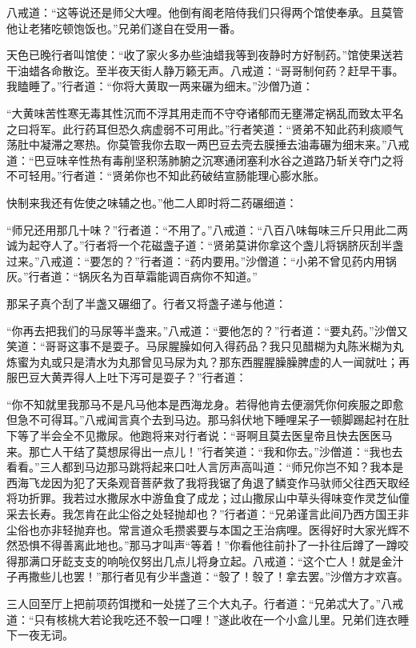 \documentclass[12pt,UTF8]{ctexbook}
\begin{document}
八戒道：“这等说还是师父大哩。他倒有阁老陪侍我们只得两个馆使奉承。且莫管他让老猪吃顿饱饭也。”兄弟们遂自在受用一番。

天色已晚行者叫馆使：“收了家火多办些油蜡我等到夜静时方好制药。”馆使果送若干油蜡各命散讫。至半夜天街人静万籁无声。八戒道：“哥哥制何药？赶早干事。我瞌睡了。”行者道：“你将大黄取一两来碾为细末。”沙僧乃道：

“大黄味苦性寒无毒其性沉而不浮其用走而不守夺诸郁而无壅滞定祸乱而致太平名之曰将军。此行药耳但恐久病虚弱不可用此。”行者笑道：“贤弟不知此药利痰顺气荡肚中凝滞之寒热。你莫管我你去取一两巴豆去壳去膜捶去油毒碾为细末来。”八戒道：“巴豆味辛性热有毒削坚积荡肺腑之沉寒通闭塞利水谷之道路乃斩关夺门之将不可轻用。”行者道：“贤弟你也不知此药破结宣肠能理心膨水胀。

快制来我还有佐使之味辅之也。”他二人即时将二药碾细道：

“师兄还用那几十味？”行者道：“不用了。”八戒道：“八百八味每味三斤只用此二两诚为起夺人了。”行者将一个花磁盏子道：“贤弟莫讲你拿这个盏儿将锅脐灰刮半盏过来。”八戒道：“要怎的？”行者道：“药内要用。”沙僧道：“小弟不曾见药内用锅灰。”行者道：“锅灰名为百草霜能调百病你不知道。”

那呆子真个刮了半盏又碾细了。行者又将盏子递与他道：

“你再去把我们的马尿等半盏来。”八戒道：“要他怎的？”行者道：“要丸药。”沙僧又笑道：“哥哥这事不是耍子。马尿腥臊如何入得药品？我只见醋糊为丸陈米糊为丸炼蜜为丸或只是清水为丸那曾见马尿为丸？那东西腥腥臊臊脾虚的人一闻就吐；再服巴豆大黄弄得人上吐下泻可是耍子？”行者道：

“你不知就里我那马不是凡马他本是西海龙身。若得他肯去便溺凭你何疾服之即愈但急不可得耳。”八戒闻言真个去到马边。那马斜伏地下睡哩呆子一顿脚踢起衬在肚下等了半会全不见撒尿。他跑将来对行者说：“哥啊且莫去医皇帝且快去医医马来。那亡人干结了莫想尿得出一点儿！”行者笑道：“我和你去。”沙僧道：“我也去看看。”三人都到马边那马跳将起来口吐人言厉声高叫道：“师兄你岂不知？我本是西海飞龙因为犯了天条观音菩萨救了我将我锯了角退了鳞变作马驮师父往西天取经将功折罪。我若过水撒尿水中游鱼食了成龙；过山撒尿山中草头得味变作灵芝仙僮采去长寿。我怎肯在此尘俗之处轻抛却也？”行者道：“兄弟谨言此间乃西方国王非尘俗也亦非轻抛弃也。常言道众毛攒裘要与本国之王治病哩。医得好时大家光辉不然恐惧不得善离此地也。”那马才叫声“等着！”你看他往前扑了一扑往后蹲了一蹲咬得那满口牙龁支支的响喨仅努出几点儿将身立起。八戒道：“这个亡人！就是金汁子再撒些儿也罢！”那行者见有少半盏道：“彀了！彀了！拿去罢。”沙僧方才欢喜。

三人回至厅上把前项药饵搅和一处搓了三个大丸子。行者道：“兄弟忒大了。”八戒道：“只有核桃大若论我吃还不彀一口哩！”遂此收在一个小盒儿里。兄弟们连衣睡下一夜无词。
\end{document}
